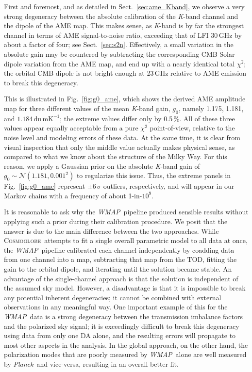 \documentclass[twocolumn]{../../common/aa}
\def\WMAP{\emph{WMAP}}
\def\Planck{\emph{Planck}}
\newcommand{\cosmoglobe}{\textsc{Cosmoglobe}}
\newcommand{\K}[0]{\textit K}
\begin{document}
First and foremost, and as detailed in Sect.~\ref{sec:ame_Kband}, we observe a very strong degeneracy between the absolute calibration of the \K-band channel and the dipole of the AME map. This makes sense, as \K-band is by far the strongest channel in terms of AME signal-to-noise ratio, exceeding that of LFI 30\,GHz by about a factor of four; see Sect.~\ref{sec:s2n}. Effectively, a small variation in the absolute gain may be countered by subtracting the corresponding CMB Solar dipole variation from the AME map, and end up with a nearly identical total $\chi^2$; the orbital CMB dipole is not bright enough at 23\,GHz relative to AME emission to break this degeneracy.

This is illustrated in Fig.~\ref{fig:g0_ame}, which shows the derived AME amplitude map for three different values of the mean \K-band gain, $g_0$, namely 1.175, 1.181, and $1.184\,\mathrm{du\,mK^{-1}}$; the extreme values differ only by 0.5\,\%. All of these three values appear equally acceptable from a pure $\chi^2$ point-of-view, relative to the noise level and modeling errors of these data. At the same time, it is clear from visual inspection that only the middle value actually makes physical sense, as compared to what we know about the structure of the Milky Way. For this reason, we apply a Gaussian prior on the absolute \K-band gain of $g_0 \sim \mathcal N(1.181, 0.001^2)$ to regularize this issue. Thus, the extreme panels in Fig.~\ref{fig:g0_ame} represent $\pm6\,\sigma$ outliers, respectively, and will appear in our Markov chains with a frequency of about 1-in-$10^9$.

It is reasonable to ask why the \WMAP\ pipeline produced sensible results without applying such a prior during their calibration procedure. We posit that the answer is due to the main difference between the two approaches. While \cosmoglobe\ attempts to fit a single overall parametric model to all data at once, the \WMAP\ pipeline calibrated each channel independently by coadding data from one channel into a map, subtracting that map from the TOD, fitting the gain to the orbital dipole, and iterating until the solution became stable. An advantage of the single-channel approach is that the solution is independent of the assumed sky model. However, a disadvantage is that it is impossible to break any potential inherent degeneracies; it cannot be combined with external observations in any meaningful way. One important example of this for the \WMAP\ data is a strong degeneracy between the transmission imbalance factors and the polarized sky signal; it is exceedingly difficult to break this degeneracy using data from only one DA alone, and the resulting errors will propagate to most other aspects in the analysis. In the global approach, on the other hand, the polarization modes that are poorly measured by \WMAP\ alone are well measured by \Planck\ and vice-versa, resulting in an overall better fit. 
\end{document}
